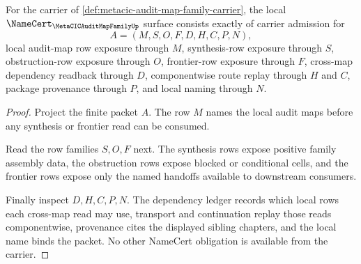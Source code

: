 \begin{theorem}
\label{thm:metacic-audit-map-family-namecert-obligations}
For the carrier of \autoref{def:metacic-audit-map-family-carrier}, the local $\NameCert_{\MetaCICAuditMapFamilyUp}$ surface consists exactly of carrier admission for
$$
A=(M,S,O,F,D,H,C,P,N),
$$
local audit-map row exposure through $M$, synthesis-row exposure through $S$, obstruction-row exposure through $O$, frontier-row exposure through $F$, cross-map dependency readback through $D$, componentwise route replay through $H$ and $C$, package provenance through $P$, and local naming through $N$.
\end{theorem}
\begin{proof}
Project the finite packet $A$. The row $M$ names the local audit maps before any synthesis or frontier read can be consumed.

Read the row families $S,O,F$ next. The synthesis rows expose positive family assembly data, the obstruction rows expose blocked or conditional cells, and the frontier rows expose only the named handoffs available to downstream consumers.

Finally inspect $D,H,C,P,N$. The dependency ledger records which local rows each cross-map read may use, transport and continuation replay those reads componentwise, provenance cites the displayed sibling chapters, and the local name binds the packet. No other NameCert obligation is available from the carrier.
\end{proof}

